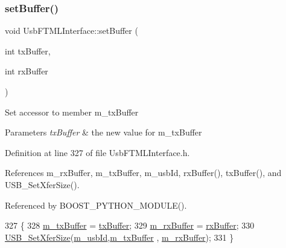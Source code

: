 \subsubsection{\texorpdfstring{set\+Buffer()}{setBuffer()}}
{\footnotesize\ttfamily void Usb\+F\+T\+M\+L\+Interface\+::set\+Buffer (\begin{DoxyParamCaption}\item[{int}]{tx\+Buffer,  }\item[{int}]{rx\+Buffer }\end{DoxyParamCaption})\hspace{0.3cm}{\ttfamily [inline]}}

Set accessor to member m\+\_\+tx\+Buffer 
\begin{DoxyParams}{Parameters}
{\em tx\+Buffer} & the new value for m\+\_\+tx\+Buffer \\
\hline
\end{DoxyParams}


Definition at line 327 of file Usb\+F\+T\+M\+L\+Interface.\+h.



References m\+\_\+rx\+Buffer, m\+\_\+tx\+Buffer, m\+\_\+usb\+Id, rx\+Buffer(), tx\+Buffer(), and U\+S\+B\+\_\+\+Set\+Xfer\+Size().



Referenced by B\+O\+O\+S\+T\+\_\+\+P\+Y\+T\+H\+O\+N\+\_\+\+M\+O\+D\+U\+L\+E().


\begin{DoxyCode}
327                                               \{
328     \hyperlink{classUsbFTMLInterface_a4057fb62dc732ffe98df5c46231d7a23}{m\_txBuffer} = \hyperlink{classUsbFTMLInterface_ada338c9311fdb6d788a951f41cf9101f}{txBuffer};
329     \hyperlink{classUsbFTMLInterface_a8f0f8bb2a4fe14ca4890695f41fbcbf8}{m\_rxBuffer} = \hyperlink{classUsbFTMLInterface_a41db8f21098bca8fb7a85ce1058ab10b}{rxBuffer};
330     \hyperlink{LALUsbML_8h_a671ccd24a9539d26bae5926a06662129}{USB\_SetXferSize}(\hyperlink{classUsbFTMLInterface_aab6754587c303660d5c498ce34a2b4c8}{m\_usbId},\hyperlink{classUsbFTMLInterface_a4057fb62dc732ffe98df5c46231d7a23}{m\_txBuffer} , 
      \hyperlink{classUsbFTMLInterface_a8f0f8bb2a4fe14ca4890695f41fbcbf8}{m\_rxBuffer});
331   \}
\end{DoxyCode}
\mbox{\label{classElement_ab476b4b1df5954141ceb14f072433b89}} 
